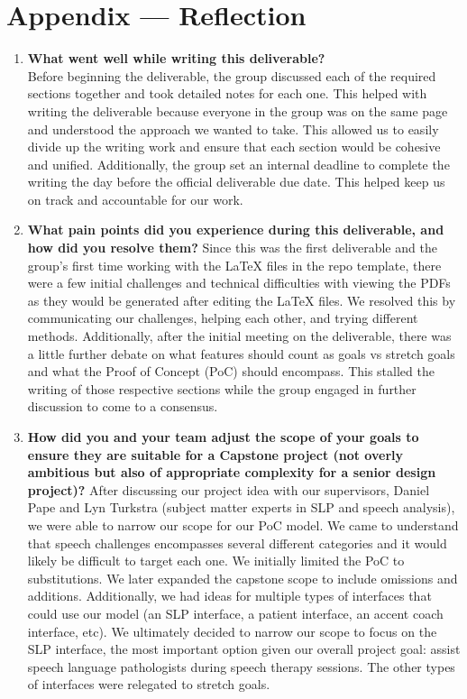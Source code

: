\documentclass{article}
\begin{document}
\newpage{}

\section*{Appendix --- Reflection}

\begin{enumerate}
    \item \textbf{What went well while writing this deliverable?} \\
    Before beginning the deliverable, the group discussed each of the required sections together and took detailed notes for each one. This helped with writing the deliverable because everyone in the group was on the same page and understood the approach we wanted to take. This allowed us to easily divide up the writing work and ensure that each section would be cohesive and unified. Additionally, the group set an internal deadline to complete the writing the day before the official deliverable due date. This helped keep us on track and accountable for our work.
    \item \textbf{What pain points did you experience during this deliverable, and how
    did you resolve them?}
    Since this was the first deliverable and the group's first time working with the LaTeX files in the repo template, there were a few initial challenges and technical difficulties with viewing the PDFs as they would be generated after editing the LaTeX files. We resolved this by communicating our challenges, helping each other, and trying different methods. 
    Additionally, after the initial meeting on the deliverable, there was a little further debate on what features should count as goals vs stretch goals and what the Proof of Concept (PoC) should encompass. This stalled the writing of those respective sections while the group engaged in further discussion to come to a consensus.
    \item \textbf{How did you and your team adjust the scope of your goals to ensure
    they are suitable for a Capstone project (not overly ambitious but also of
    appropriate complexity for a senior design project)?}
    After discussing our project idea with our supervisors, Daniel Pape and Lyn Turkstra (subject matter experts in SLP and speech analysis), we were able to narrow our scope for our PoC model. We came to understand that speech challenges encompasses several different categories and it would likely be difficult to target each one. We initially limited the PoC to substitutions. We later expanded the capstone scope to include omissions and additions.
    Additionally, we had ideas for multiple types of interfaces that could use our model (an SLP interface, a patient interface, an accent coach interface, etc). We ultimately decided to narrow our scope to focus on the SLP interface, the most important option given our overall project goal: assist speech language pathologists during speech therapy sessions. The other types of interfaces were relegated to stretch goals.

\end{enumerate}  
\end{document}
